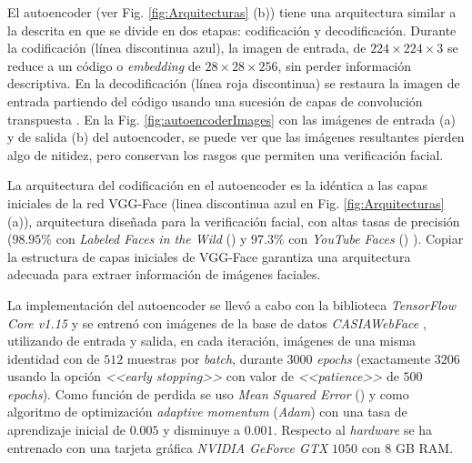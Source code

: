 El \gls{autoencoder} (ver Fig. \ref{fig:Arquitecturas} (b)) tiene una arquitectura  similar a la descrita en \cite{deepLearningBook} que se divide en dos etapas: codificación y decodificación. Durante la codificación (línea discontinua azul), la imagen de entrada, de $224\times224\times3$ se reduce a un código o \textit{\gls{embedding}} de $28\times28\times256$, sin perder información descriptiva. En la decodificación (línea roja discontinua) se restaura la imagen de entrada partiendo del código usando una sucesión de capas de convolución transpuesta \cite{zeiler2010deconvolutional}. En la Fig. \ref{fig:autoencoderImages} con las imágenes de entrada (a) y de salida (b) del \gls{autoencoder}, se puede ver que las imágenes resultantes pierden algo de nitidez, pero conservan los rasgos que permiten una verificación facial.

La arquitectura del codificación en el \gls{autoencoder} es la idéntica a las capas iniciales de la red \Gls{VGG-Face} \cite{parkhi2015deep} (linea discontinua azul en Fig. \ref{fig:Arquitecturas} (a)), arquitectura  diseñada para la verificación facial, con altas tasas de precisión ($98.95\%$ con \textit{Labeled Faces in the Wild} () \cite{huang2008labeled} y $97.3\%$ con \textit{YouTube Faces} () \cite{wolf2011face}). Copiar la estructura de capas iniciales de \Gls{VGG-Face} garantiza una arquitectura adecuada para extraer información de imágenes faciales.


La implementación del \gls{autoencoder} se llevó a cabo con la biblioteca \textit{TensorFlow Core v1.15} y se entrenó con imágenes de la base de datos \textit{CASIAWebFace} \cite{CASIAWebFace_DataBase}, utilizando de entrada y salida, en cada iteración, imágenes de una misma identidad con de $512$ muestras por \textit{batch}, durante $3000$ \textit{epochs} (exactamente $3206$ usando la opción \textit{<<early stopping>>} con valor de \textit{<<patience>>} de $500$ \textit{epochs}). Como función de perdida se uso \textit{Mean Squared Error} () y como algoritmo de optimización \textit{adaptive momentum} (\textit{Adam}) \cite{kingma2014adam} con una tasa de aprendizaje inicial de $0.005$ y disminuye a $0.001$. Respecto al \textit{hardware} se ha entrenado con una tarjeta gráfica \textit{NVIDIA GeForce GTX} $1050$ con $8$ GB RAM. 

